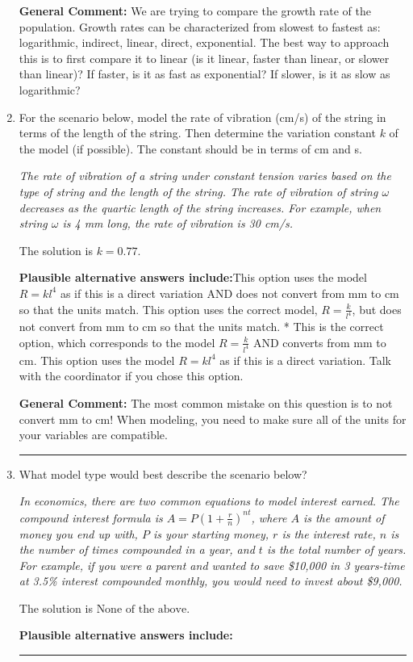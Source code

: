 \documentclass{extbook}[14pt]
\newcommand{\litem}[1]{\item #1

\rule{\textwidth}{0.4pt}}
\begin{document}
\begin{enumerate}
{\textbf{General Comment:} We are trying to compare the growth rate of the population. Growth rates can be characterized from slowest to fastest as: logarithmic, indirect, linear, direct, exponential. The best way to approach this is to first compare it to linear (is it linear, faster than linear, or slower than linear)? If faster, is it as fast as exponential? If slower, is it as slow as logarithmic?
}
\litem{
For the scenario below, model the rate of vibration (cm/s) of the string in terms of the length of the string. Then determine the variation constant $k$ of the model (if possible). The constant should be in terms of cm and s.

\begin{center}
    \textit{ The rate of vibration of a string under constant tension varies based on the type of string and the length of the string. The rate of vibration of string $\omega$ decreases as the quartic length of the string increases. For example, when string $\omega$ is 4 mm long, the rate of vibration is 30 cm/s. }
\end{center}
The solution is \( k = 0.77 \).\begin{enumerate}[label=\Alph*.]
\textbf{Plausible alternative answers include:}This option uses the model $R = kl^{4}$ as if this is a direct variation AND does not convert from mm to cm so that the units match.
This option uses the correct model, $R = \frac{k}{l^{4}}$, but does not convert from mm to cm so that the units match.
* This is the correct option, which corresponds to the model $R = \frac{k}{l^{4}}$ AND converts from mm to cm.
This option uses the model $R = kl^{4}$ as if this is a direct variation.
Talk with the coordinator if you chose this option.
\end{enumerate}

\textbf{General Comment:} The most common mistake on this question is to not convert mm to cm! When modeling, you need to make sure all of the units for your variables are compatible.
}
\litem{
What model type would best describe the scenario below?

\begin{center}
    \textit{ In economics, there are two common equations to model interest earned. The compound interest formula is $A = P (1 + \frac{r}{n})^{nt}$, where $A$ is the amount of money you end up with, $P$ is your starting money, $r$ is the interest rate, $n$ is the number of times compounded in a year, and $t$ is the total number of years. For example, if you were a parent and wanted to save \$10,000 in 3 years-time at 3.5\% interest compounded monthly, you would need to invest about \$9,000. }
\end{center}
The solution is \( \text{None of the above} \).\begin{enumerate}[label=\Alph*.]
\textbf{Plausible alternative answers include:}




\end{enumerate}}
\end{enumerate}
\end{document}

